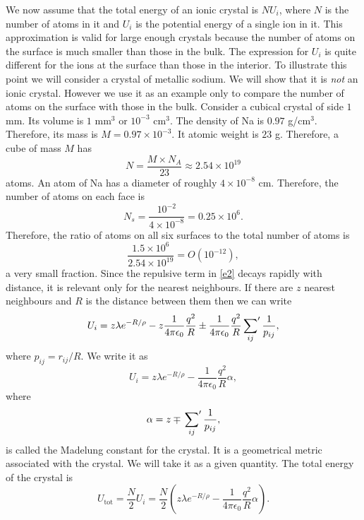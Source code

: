 \documentclass{article}
\begin{document}
We now assume that the total energy of an ionic crystal is $NU_i$, where $N$ is
the number of atoms in it and $U_i$ is the potential energy of a single ion in
it. This approximation is valid for large enough crystals
because the number of atoms on the surface is much smaller than those in the 
bulk. The expression for $U_i$ is quite different for the ions at the surface 
than those in the interior. To illustrate this point we will consider a crystal
of metallic sodium. We will show that it is \emph{not} an ionic crystal. However
we use it as an example only to compare the number of atoms on the surface with
those in the bulk. Consider a cubical crystal of side $1$ mm. Its volume is
$1$ mm$^3$ or $10^{-3}$ cm$^3$. The density of Na is $0.97$ g/cm$^3$. Therefore,
its mass is $M = 0.97 \times 10^{-3}$. It atomic weight is $23$ g. Therefore, a
cube of mass $M$ has
\[
N = \frac{M \times N_A}{23} \approx 2.54 \times 10^{19}
\]
atoms. An atom of Na has a diameter of roughly $4 \times 10^{-8}$ cm. Therefore,
the number of atoms on each face is
\[
N_s = \frac{10^{-2}}{4 \times 10^{-8}} = 0.25 \times 10^6.
\]
Therefore, the ratio of atoms on all six surfaces to the total number of atoms
is
\[
\frac{1.5 \times 10^6}{2.54 \times 10^{19}} = O(10^{-12}),
\]
a very small fraction. Since the repulsive term in \eqref{e2} decays rapidly
with distance, it is relevant only for the nearest neighbours. If there are $z$
nearest neighbours and $R$ is the distance between them then we can write
\begin{equation}\label{e3}
U_i = z\lambda e^{-R/\rho} - z\frac{1}{4\pi\epsilon_0}\frac{q^2}{R}  \pm 
\frac{1}{4\pi\epsilon_0}\frac{q^2}{R} 
\sideset{}{^\prime}\sum_{ij}\frac{1}{p_{ij}},
\end{equation}
where $p_{ij} = r_{ij}/R$. We write it as
\begin{equation}\label{e4}
U_i = z\lambda e^{-R/\rho} - \frac{1}{4\pi\epsilon_0}\frac{q^2}{R}\alpha,
\end{equation}
where
\begin{equation}\label{e5}
\alpha = z \mp \sideset{}{^\prime}\sum_{ij}\frac{1}{p_{ij}},
\end{equation}
is called the Madelung constant for the crystal. It is a geometrical metric
associated with the crystal. We will take it as a given quantity. The total
energy of the crystal is
\begin{equation}\label{e6}
U_\text{tot} = \frac{N}{2}U_i = \frac{N}{2}
\left(z\lambda e^{-R/\rho} -\frac{1}{4\pi\epsilon_0}\frac{q^2}{R}\alpha\right).
\end{equation}
\end{document}
